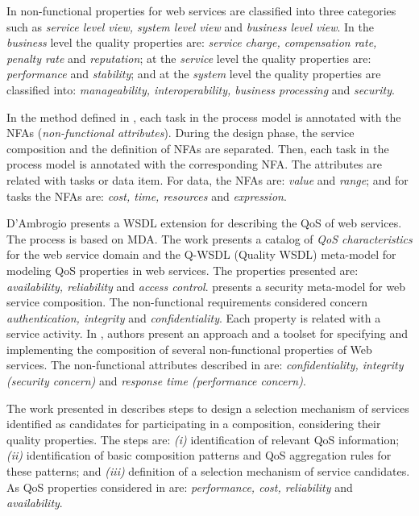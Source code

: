 \documentclass{sig-alternate}
\begin{document}
In \cite{Babamir2010,Yeom2006} non-functional properties for web services
are classified into three categories such as
\textit{service level view, system level view} and \textit{business level view}.
In the \textit{\textit{business}} level the quality properties are:
\textit{service charge, compensation rate, penalty rate} and
\textit{reputation}; at the \textit{\textit{service}} level the quality
properties are: \textit{performance} and \textit{stability}; and at the
\textit{system} level the quality properties are classified into:
\textit{manageability, interoperability, business processing} and
\textit{security}.

In the method defined in \cite{XiaoCZBOLH08}, each task in the process model is
annotated with the NFAs (\textit{non-functional attributes}). During the design phase, the
service composition and the definition of NFAs are separated. Then,
each task in the process model is annotated with the corresponding NFA. The
attributes are related with tasks or data item. For data, the NFAs are:
\textit{value} and \textit{range}; and for tasks the NFAs are: \textit{cost,
time, resources} and \textit{expression}.

D'Ambrogio \cite{DAmbrogio06} presents a WSDL extension for describing the QoS
of web services. The process is based on MDA. The work presents a catalog
of \textit{QoS characteristics} for the web service domain and the Q-WSDL
(Quality WSDL) meta-model for modeling QoS properties in web services. The properties
presented are: \textit{availability, reliability} and \textit{access
control}. \cite{CholletL09} presents a security meta-model for web service
composition. The non-functional requirements considered concern
\textit{authentication, integrity} and \textit{confidentiality}. Each property is related with a service activity. In \cite{SchmelingCM11}, authors
present an approach and a toolset for specifying and implementing the
composition of several non-functional properties of Web services. The
non-functional attributes described in \cite{SchmelingCM11} are: \textit{confidentiality, integrity
(security concern)} and \textit{response time (performance concern)}.

The work presented in \cite{ThissenW06} describes
steps to design a selection mechanism of services identified as candidates for
participating in a composition, considering their quality properties. The steps
are: \textit{(i)} identification of relevant QoS information; \textit{(ii)} identification of basic composition patterns and
QoS aggregation rules for these patterns; and \textit{(iii)} definition of a
selection mechanism of service candidates. As QoS properties considered in
\cite{ThissenW06} are: \textit{performance, cost, reliability} and
\textit{availability}. 
  
\end{document}
